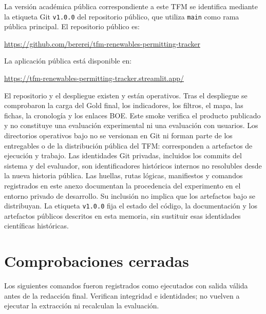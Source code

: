 La versión académica pública correspondiente a este TFM se identifica mediante
la etiqueta Git \texttt{v1.0.0} del repositorio público, que utiliza
\texttt{main} como rama pública principal. El repositorio público es:
\begin{center}
\url{https://github.com/bererei/tfm-renewables-permitting-tracker}
\end{center}
La aplicación pública está disponible en:
\begin{center}
\url{https://tfm-renewables-permitting-tracker.streamlit.app/}
\end{center}
El repositorio y el despliegue existen y están operativos. Tras el despliegue se
comprobaron la carga del Gold final, los indicadores, los filtros, el mapa, las
fichas, la cronología y los enlaces BOE. Este smoke verifica el producto
publicado y no constituye una evaluación experimental ni una evaluación con
usuarios. Los directorios operativos bajo  no se versionan en
Git ni forman parte de los entregables o de la distribución pública del TFM:
corresponden a artefactos de ejecución y trabajo. Las identidades Git privadas,
incluidos los commits del sistema y del evaluador, son identificadores
históricos internos no resolubles desde la nueva historia pública. Las huellas,
rutas lógicas, manifiestos y comandos registrados en este anexo documentan la
procedencia del experimento en el entorno privado de desarrollo. Su inclusión
no implica que los artefactos bajo  se distribuyan. La etiqueta
\texttt{v1.0.0} fija el estado del código, la documentación y los artefactos
públicos descritos en esta memoria, sin sustituir esas identidades científicas
históricas.

\section{Comprobaciones cerradas}
Los siguientes comandos fueron registrados como ejecutados con salida válida
antes de la redacción final. Verifican integridad e identidades; no vuelven a
ejecutar la extracción ni recalculan la evaluación.

